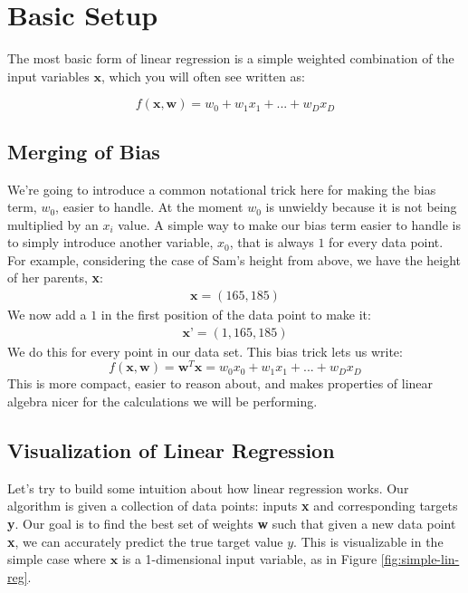 \section{Basic Setup}
The most basic form of linear regression is a simple weighted combination of the input variables $\textbf{x}$, which you will often see written as:

\begin{equation}
    f(\textbf{x}, \textbf{w}) = w_{0} + w_{1}x_{1} + ... + w_{D}x_{D}
\end{equation}

\subsection{Merging of Bias}
We're going to introduce a common notational trick here for making the bias term, $w_{0}$, easier to handle. At the moment $w_{0}$ is unwieldy because it is not being multiplied by an $x_{i}$ value. A simple way to make our bias term easier to handle is to simply introduce another variable, $x_{0}$, that is always $1$ for every data point. For example, considering the case of Sam's height from above, we have the height of her parents, \textbf{x}:
\begin{align*}
    \textbf{x} = (165, 185)
\end{align*}
We now add a $1$ in the first position of the data point to make it:
\begin{align*}
    \textbf{x'} = (1, 165, 185)
\end{align*}
We do this for every point in our data set. This bias trick lets us write:
\begin{equation}
    f(\textbf{x}, \textbf{w}) = \textbf{w}^{T}\textbf{x} = w_{0}x_{0} + w_{1}x_{1} + ... + w_{D}x_{D}
\end{equation}
This is more compact, easier to reason about, and makes properties of linear algebra nicer for the calculations we will be performing.

\subsection{Visualization of Linear Regression}
Let's try to build some intuition about how linear regression works. Our algorithm is given a collection of data points: inputs \textbf{x} and corresponding targets \textbf{y}. Our goal is to find the best set of weights \textbf{w} such that given a new data point \textbf{x}, we can accurately predict the true target value $y$. This is visualizable in the simple case where $\textbf{x}$ is a 1-dimensional input variable, as in Figure \ref{fig:simple-lin-reg}.

